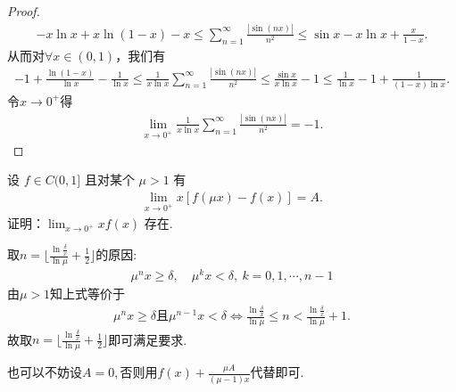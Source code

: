 \documentclass[../../main.tex]{subfiles}%
\begin{document}
\begin{proof}
\begin{align*}
-x\ln x+x\ln \left( 1-x \right)-x\leqslant \sum_{n=1}^{\infty}\frac{|\sin(nx)|}{n^2}\leqslant \sin x-x\ln x+\frac{x}{1-x}.
\end{align*}
从而对$\forall x\in (0,1)$，我们有
\begin{align*}
-1+\frac{\ln \left( 1-x \right)}{\ln x}-\frac{1}{\ln x} \leqslant \frac{1}{x\ln x}\sum_{n=1}^{\infty}\frac{|\sin(nx)|}{n^2}\leqslant \frac{\sin x}{x\ln x}-1\leqslant \frac{1}{\ln x}-1+\frac{1}{(1-x)\ln x}.
\end{align*}
令$x\rightarrow 0^+$得
\begin{align*}
\lim_{x\rightarrow 0^+}\frac{1}{x\ln x}\sum_{n=1}^{\infty}\frac{|\sin(nx)|}{n^2}=-1.
\end{align*}
\end{proof}

\begin{example}
设 $f \in C(0,1]$ 且对某个 $\mu > 1$ 有
\begin{align*}
\lim_{x \to 0^+} x[f(\mu x) - f(x)] = A.
\end{align*}
证明：$\lim_{x \to 0^+} x f(x)$ 存在.
\end{example}
\begin{note}
取$n=\lfloor \frac{\ln \frac{\delta}{x}}{\ln \mu} + \frac{1}{2} \rfloor$的原因:
\begin{align*}
\mu^n x \geqslant \delta, \quad \mu^k x < \delta, \ k=0,1,\cdots,n-1
\end{align*}
由$\mu > 1$知上式等价于
\begin{align*}
\mu^n x \geqslant  \delta \text{且}\mu^{n-1} x <\delta \Longleftrightarrow \frac{\ln \frac{\delta}{x}}{\ln \mu} \leqslant n < \frac{\ln \frac{\delta}{x}}{\ln \mu} + 1.
\end{align*}
故取$n=\lfloor \frac{\ln \frac{\delta}{x}}{\ln \mu} + \frac{1}{2} \rfloor$即可满足要求.
\end{note}
\begin{remark}
也可以不妨设$A=0,$否则用$f(x)+\frac{\mu A}{(\mu - 1)x}$代替即可.
\end{remark}
\end{document}

